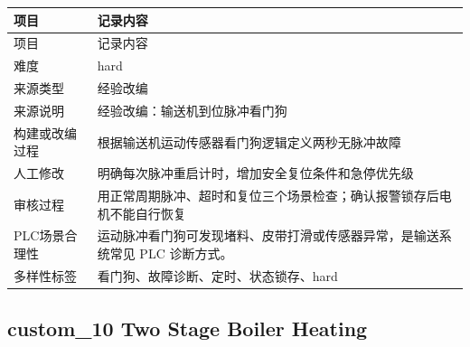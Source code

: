 \begin{longtable}{L{3.0cm}L{10.3cm}}

\toprule

项目 & 记录内容\\

\midrule

\endfirsthead

\toprule

项目 & 记录内容\\

\midrule

\endhead

难度 & hard\\

来源类型 & 经验改编\\

来源说明 & 经验改编：输送机到位脉冲看门狗\\

构建或改编过程 & 根据输送机运动传感器看门狗逻辑定义两秒无脉冲故障\\

人工修改 & 明确每次脉冲重启计时，增加安全复位条件和急停优先级\\

审核过程 & 用正常周期脉冲、超时和复位三个场景检查；确认报警锁存后电机不能自行恢复\\

PLC场景合理性 & 运动脉冲看门狗可发现堵料、皮带打滑或传感器异常，是输送系统常见 PLC 诊断方式。\\

多样性标签 & 看门狗、故障诊断、定时、状态锁存、hard\\

\bottomrule

\end{longtable}

\subsection{{\ttfamily custom\_10} Two Stage Boiler Heating}

